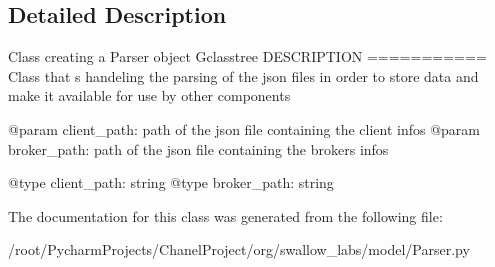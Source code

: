 \subsection{Detailed Description}
\begin{DoxyVerb}    Class creating a Parser object
    G{classtree}
    DESCRIPTION
    ===========
    Class that s handeling the parsing of the json files in order to store data and make it available for use
    by other components

    @param client_path:    path of the json file containing the client infos
    @param broker_path:    path of the json file containing the brokers infos

    @type client_path: string
    @type broker_path: string
\end{DoxyVerb}
 

The documentation for this class was generated from the following file\+:\begin{DoxyCompactItemize}
\item 
/root/\+Pycharm\+Projects/\+Chanel\+Project/org/swallow\+\_\+labs/model/Parser.\+py\end{DoxyCompactItemize}

